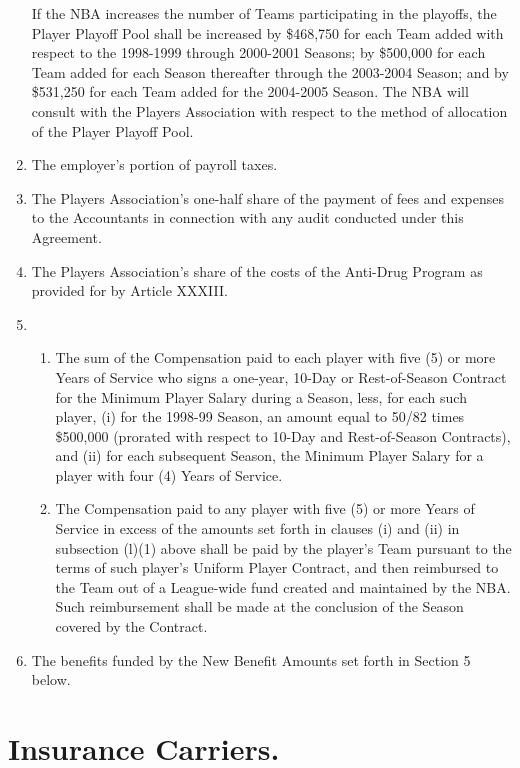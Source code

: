 \documentclass[
]{book}
\providecommand{\tightlist}{%
  \setlength{\itemsep}{0pt}\setlength{\parskip}{0pt}}
\begin{document}
\begin{enumerate}
  If the NBA increases the number of Teams participating in the playoffs, the Player Playoff Pool shall be increased by \$468,750 for each Team added with respect to the 1998-1999 through 2000-2001 Seasons; by \$500,000 for each Team added for each Season thereafter through the 2003-2004 Season; and by \$531,250 for each Team added for the 2004-2005 Season. The NBA will consult with the Players Association with respect to the method of allocation of the Player Playoff Pool.
\item
  The employer's portion of payroll taxes.
\item
  The Players Association's one-half share of the payment of fees and expenses to the Accountants in connection with any audit conducted under this Agreement.
\item
  The Players Association's share of the costs of the Anti-Drug Program as provided for by Article XXXIII.
\item
  \begin{enumerate}
  \def\labelenumii{(\arabic{enumii})}
  \tightlist
  \item
    The sum of the Compensation paid to each player with five (5) or more Years of Service who signs a one-year, 10-Day or Rest-of-Season Contract for the Minimum Player Salary during a Season, less, for each such player, (i) for the 1998-99 Season, an amount equal to 50/82 times \$500,000 (prorated with respect to 10-Day and Rest-of-Season Contracts), and (ii) for each subsequent Season, the Minimum Player Salary for a player with four (4) Years of Service.
  \item
    The Compensation paid to any player with five (5) or more Years of Service in excess of the amounts set forth in clauses (i) and (ii) in subsection (l)(1) above shall be paid by the player's Team pursuant to the terms of such player's Uniform Player Contract, and then reimbursed to the Team out of a League-wide fund created and maintained by the NBA. Such reimbursement shall be made at the conclusion of the Season covered by the Contract.
  \end{enumerate}
\item
  The benefits funded by the New Benefit Amounts set forth in Section 5 below.
\end{enumerate}

\hypertarget{insurance-carriers.}{%
\section{Insurance Carriers.}\label{insurance-carriers.}}
\end{document}
